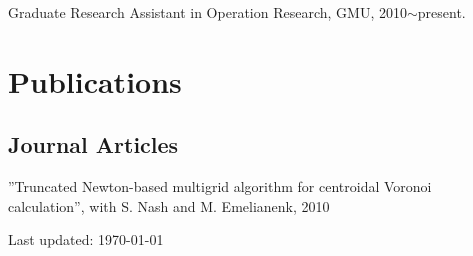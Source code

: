 \documentclass[letterpaper]{article}
\renewenvironment{itemize}{
  \begin{list}{}{
    \setlength{\leftmargin}{1.5em}
  }
}{
  \end{list}
}
\begin{document}
\begin{itemize}
\item Graduate Research Assistant in Operation Research,  GMU, 2010$\sim$present.
\end{itemize}


\section*{Publications}

\subsection*{Journal Articles}

\begin{itemize}
\item ''Truncated Newton-based multigrid algorithm for centroidal Voronoi calculation'', with S. Nash and M. Emelianenk, 2010

\end{itemize}


\bigskip

\begin{center}
  \begin{footnotesize}
    Last updated: \today \\
  \end{footnotesize}
\end{center}
\end{document}
